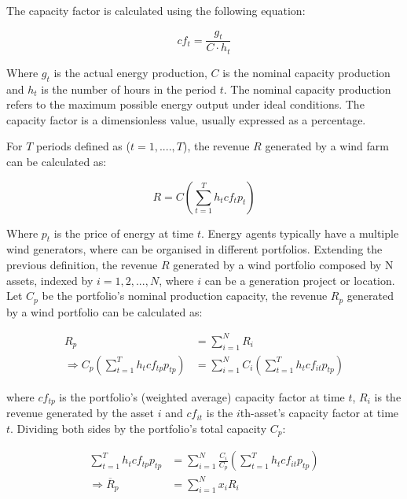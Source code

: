     The capacity factor is calculated using the following equation:

    \begin{equation}
        cf_t =
        \frac{g_{t}}{C \cdot h_{t}}
    \label{eq:capacity_factor}
    \end{equation}

    Where $g_{t}$ is the actual energy production, $C$ is the nominal capacity production and $h_{t}$ is the
    number of hours in the period $t$.
    The nominal capacity production refers to the maximum possible energy output under ideal conditions.
    The capacity factor is a dimensionless value, usually expressed as a percentage.

    For $T$ periods defined as ($t=1,....,T$), the revenue $R$ generated by a wind farm can be calculated as:

    \begin{equation}
        R = C \left( \sum_{t=1}^{T} h_{t} cf_{t} p_{t} \right)
    \label{eq:revenue_wf}
    \end{equation}

    Where $p_{t}$ is the price of energy at time $t$.
    Energy agents typically have a multiple wind generators, where can be organised in different portfolios.
    Extending the previous definition, the revenue $R$ generated by a wind portfolio composed by N assets, indexed by
    $i= 1,2, ..., N$, where $i$ can be a generation project or location.
    Let $C_{p}$ be the portfolio's nominal production capacity,
    the revenue $R_{p}$ generated by a wind portfolio can be calculated as:

    \begin{align}
        R_{p} &= \sum_{i=1}^{N} R_{i} \\
        \Rightarrow C_{p} \left( \sum_{t=1}^{T} h_{t} cf_{tp} p_{tp} \right) &=
        \sum_{i=1}^{N} C_{i} \left(  \sum_{t=1}^{T} h_{t} cf_{it} p_{tp} \right)
    \label{eq:revenue_pf}
    \end{align}

    where $cf_{tp}$ is the portfolio's (weighted average) capacity factor at time $t$, $R_{i}$ is the revenue generated by
    the asset $i$ and $cf_{it}$ is the $i$th-asset's capacity factor at time $t$.
    Dividing both sides by the portfolio's total capacity $C_{p}$:

    \begin{align}
        \sum_{t=1}^{T} h_{t} cf_{tp} p_{tp} &=
        \sum_{i=1}^{N} \frac{C_{i}}{C_{p}} \left(  \sum_{t=1}^{T} h_{t} cf_{it} p_{tp} \right) \\
        \Rightarrow \overline{R}_{p} &= \sum_{i=1}^{N} x_{i} R_{i}
    \label{eq:revenue_std}
    \end{align}

